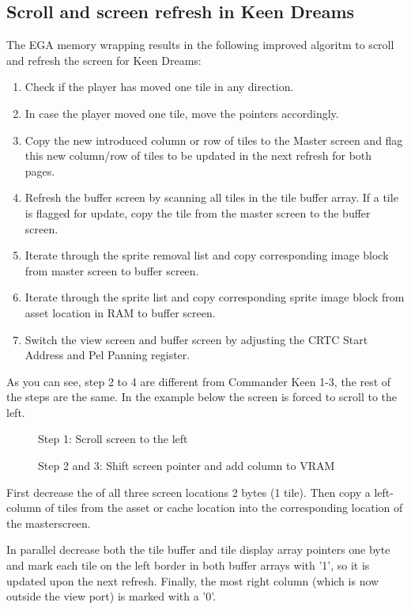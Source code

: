 \documentclass[book.tex]{subfiles}
\begin{document}
\subsection{Scroll and screen refresh in Keen Dreams} \label{section:scroll_refresh_dreams}

The EGA memory wrapping results in the following improved algoritm to scroll and refresh the screen for Keen Dreams:
\begin{enumerate}
\item Check if the player has moved one tile in any direction.
\item In case the player moved one tile, move the  pointers accordingly. 
\item Copy the new introduced column or row of tiles to the Master screen and flag this new column/row of tiles to be updated in the next refresh for both pages. 
\item Refresh the buffer screen by scanning all tiles in the tile buffer array. If a tile is flagged for update, copy the tile from the master screen to the buffer screen.
\item Iterate through the sprite removal list and copy corresponding image block from master screen to buffer screen. 
\item Iterate through the sprite list and copy corresponding sprite image block from asset location in RAM to buffer screen.
\item Switch the view screen and buffer screen by adjusting the CRTC Start Address and Pel Panning register.
\end{enumerate}

As you can see, step 2 to 4 are different from Commander Keen 1-3, the rest of the steps are the same. In the example below the screen is forced to scroll to the left.
\\

\begin{figure}[H]
\centering
 \caption{Step 1: Scroll screen to the left}
 \label{fig:kc4_6_start}
\end{figure}

\begin{figure}[H]
\centering
 \caption{Step 2 and 3: Shift screen pointer and add column to VRAM}
 \label{fig:kc4_6_add_column}
\end{figure}


First decrease the  of all three screen locations 2 bytes (1 tile). Then copy a left-column of tiles from the asset or cache location into the corresponding location of the masterscreen.\\
\par
In parallel decrease both the tile buffer and tile display array pointers one byte and mark each tile on the left border in both buffer arrays with '1', so it is updated upon the next refresh.
Finally, the most right column (which is now outside the view port) is marked with a '0'.
\end{document}
